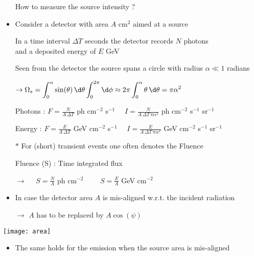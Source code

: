 \Tr
\onecolumn
\begin{itemize}
\item[] \begin{center} {\blue How to measure the source intensity ?} \end{center}
\item Consider a detector with area $A$ cm$^{2}$ aimed at a source
\item[] In a time interval $\Delta T$ seconds the detector records $N$ photons\\
        and a deposited energy of $E$ GeV
\item[] Seen from the detector the source spans a circle with radius $\alpha \ll 1$ radians
\item[] $\displaystyle \rightarrow \Omega_{s}=\int_{0}^{\alpha}\sin(\theta)\, \d\theta\int_{0}^{2\pi}\d\phi
         \approx 2\pi\int_{0}^{\alpha} \theta\,\d\theta=\pi\alpha^{2}$
\item[] {\blue Photons : $\displaystyle F=\frac{N}{A\,\Delta T}$ ph cm$^{-2}$ s$^{-1} \quad$
         $\displaystyle I=\frac{N}{A\,\Delta T\,\pi\alpha^{2}}$ ph cm$^{-2}$ s$^{-1}$ sr$^{-1}$}
\item[] {\blue Energy : $\displaystyle F=\frac{E}{A\,\Delta T}$ GeV cm$^{-2}$ s$^{-1} \quad$
         $\displaystyle I=\frac{E}{A\,\Delta T\,\pi\alpha^{2}}$ GeV cm$^{-2}$ s$^{-1}$ sr$^{-1}$}
\item[$\ast$] For (short) transient events one often denotes the {\blue Fluence}
\item[] \begin{center} {\blue Fluence (S) : Time integrated flux} \end{center}
\item[] $\rightarrow$ {\blue $\displaystyle \quad S=\frac{N}{A}$ ph cm$^{-2}$
        $\qquad \displaystyle S=\frac{E}{A}$ GeV cm$^{-2}$}
\end{itemize}

\Tr
\onecolumn
\begin{itemize}
\item In case the detector area $A$ is mis-aligned w.r.t. the incident radiation
\item[] $\rightarrow$ {\blue $A$ has to be replaced by $A\cos(\psi)$}
\end{itemize}
%
\begin{center}
\texttt{[image: area]}
\end{center}
\begin{itemize}
\item The same holds for the emission when the source area is mis-aligned
\end{itemize}

